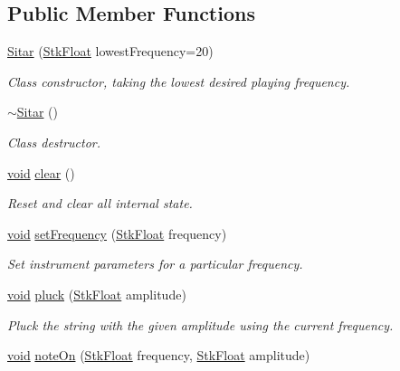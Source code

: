 \subsection*{Public Member Functions}
\begin{DoxyCompactItemize}
\item 
\hyperlink{class_nyq_1_1_sitar_a8432a087a602a0dce715045d670c11a9}{Sitar} (\hyperlink{namespace_nyq_a044fa20a706520a617bbbf458a7db7e4}{Stk\+Float} lowest\+Frequency=20)
\begin{DoxyCompactList}\small\item\em Class constructor, taking the lowest desired playing frequency. \end{DoxyCompactList}\item 
\hyperlink{class_nyq_1_1_sitar_ae249d9a9ddc73ecadd1475f3142b5c2b}{$\sim$\+Sitar} ()
\begin{DoxyCompactList}\small\item\em Class destructor. \end{DoxyCompactList}\item 
\hyperlink{sound_8c_ae35f5844602719cf66324f4de2a658b3}{void} \hyperlink{class_nyq_1_1_sitar_a7f0c83684744ce9e301149d0fab5a995}{clear} ()
\begin{DoxyCompactList}\small\item\em Reset and clear all internal state. \end{DoxyCompactList}\item 
\hyperlink{sound_8c_ae35f5844602719cf66324f4de2a658b3}{void} \hyperlink{class_nyq_1_1_sitar_a993d02fdf71bc6b0a51cc82a71bc4a88}{set\+Frequency} (\hyperlink{namespace_nyq_a044fa20a706520a617bbbf458a7db7e4}{Stk\+Float} frequency)
\begin{DoxyCompactList}\small\item\em Set instrument parameters for a particular frequency. \end{DoxyCompactList}\item 
\hyperlink{sound_8c_ae35f5844602719cf66324f4de2a658b3}{void} \hyperlink{class_nyq_1_1_sitar_ae51cc63d5cb224d72f4e6e8c164aa060}{pluck} (\hyperlink{namespace_nyq_a044fa20a706520a617bbbf458a7db7e4}{Stk\+Float} amplitude)
\begin{DoxyCompactList}\small\item\em Pluck the string with the given amplitude using the current frequency. \end{DoxyCompactList}\item 
\hyperlink{sound_8c_ae35f5844602719cf66324f4de2a658b3}{void} \hyperlink{class_nyq_1_1_sitar_ae3e32e47a7afc3637521a564116a820e}{note\+On} (\hyperlink{namespace_nyq_a044fa20a706520a617bbbf458a7db7e4}{Stk\+Float} frequency, \hyperlink{namespace_nyq_a044fa20a706520a617bbbf458a7db7e4}{Stk\+Float} amplitude)

\end{DoxyCompactItemize}
